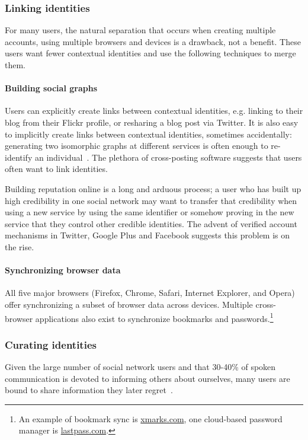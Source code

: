 \documentclass[10pt, conference, compsocconf]{IEEEtran}
\begin{document}
\subsubsection{Linking identities}

For many users, the natural separation that occurs when creating multiple
accounts, using multiple browsers and devices is a drawback, not a benefit.
These users want fewer contextual identities and use the following techniques
to merge them.

\paragraph{Building social graphs}

Users can explicitly create links between contextual identities, e.g.  linking
to their blog from their Flickr profile, or resharing a blog post via Twitter.
It is also easy to implicitly create links between contextual identities,
sometimes accidentally: generating two isomorphic graphs at different services
is often enough to re-identify an individual~\cite{narayanan1}. The plethora of
cross-posting software suggests that users often want to link
identities.

Building reputation online is a long and arduous process; a user who has built
up high credibility in one social network may want to transfer that credibility
when using a new service by using the same identifier or somehow proving in the
new service that they control other credible identities.  The advent
of verified account mechanisms in Twitter, Google Plus and Facebook suggests
this problem is on the rise.

\paragraph{Synchronizing browser data}

All five major browsers (Firefox, Chrome, Safari, Internet Explorer, and Opera)
offer synchronizing a subset of browser data across devices.
Multiple cross-browser applications also exist to
synchronize bookmarks and passwords.\footnote{An example of bookmark sync is \url{xmarks.com}, one cloud-based password manager is \url{lastpass.com}.}

\subsubsection{Curating identities}

Given the large number of social network users and that 30-40\% of spoken
communication is devoted to informing others about ourselves, many users are
bound to share information they later regret~\cite{tamir}.
\end{document}
